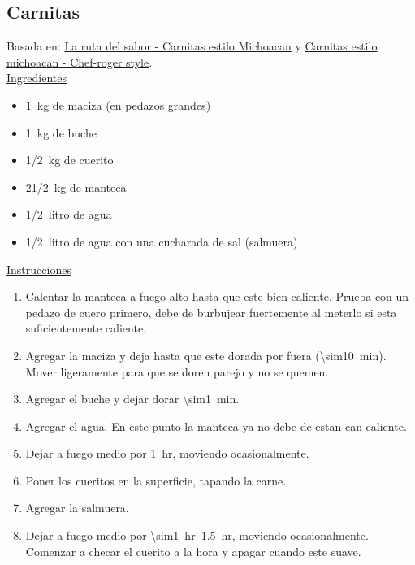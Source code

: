 \subsection{Carnitas}

Basada en: \href{https://www.youtube.com/watch?v=RHBXS7Oo1VM}{La ruta del sabor - Carnitas estilo Michoacan} y \href{https://www.youtube.com/watch?v=3Yz4mSFP9G8}{Carnitas estilo michoacan - Chef-roger style}. \\

\underline{Ingredientes}

\begin{itemize}
\item \SI{1}{kg} de maciza (en pedazos grandes)
\item \SI{1}{kg} de buche
\item \SI{1/2}{kg} de cuerito
\item 2\SI{1/2}{kg} de manteca
\item \SI{1/2}{litro} de agua
\item \SI{1/2}{litro} de agua con una cucharada de sal (salmuera)
\end{itemize}

\underline{Instrucciones}

\begin{enumerate}
\item Calentar la manteca a fuego alto hasta que este bien caliente. Prueba con un pedazo de cuero primero, debe de burbujear fuertemente al meterlo si esta suficientemente caliente.
\item Agregar la maciza y deja hasta que este dorada por fuera (\SI{\sim10}{min}). Mover ligeramente para que se doren parejo y no se quemen.
\item Agregar el buche y dejar dorar \SI{\sim1}{min}.
\item Agregar el agua. En este punto la manteca ya no debe de estan can caliente.
\item Dejar a fuego medio por \SI{1}{hr}, moviendo ocasionalmente. 
\item Poner los cueritos en la superficie, tapando la carne.
\item Agregar la salmuera.
\item Dejar a fuego medio por \SIrange{\sim1}{1.5}{hr}, moviendo ocasionalmente. Comenzar a checar el cuerito a la hora y apagar cuando este suave.  
\end{enumerate}
